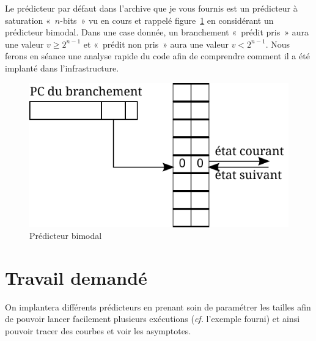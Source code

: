 \documentclass[a4paper]{article}
\begin{document}
Le prédicteur par défaut dans l'archive que je vous fournis est un prédicteur à saturation «~$n$-bits~» vu en cours et rappelé figure~\ref{2-bit} en considérant un prédicteur bimodal.
Dans une case donnée, un branchement «~prédit pris~» aura une valeur $v\geq 2^{n-1}$ et «~prédit non pris~» aura une valeur $v<2^{n-1}$.
Nous ferons en séance une analyse rapide du code afin de comprendre comment il a été implanté dans l'infrastructure.

\begin{figure}[htb]
      \center\includegraphics[scale=1]{2-bits}
      \caption{Prédicteur bimodal}
      \label{2-bit}
\end{figure}

\section{Travail demandé}
On implantera différents prédicteurs en prenant soin de paramétrer les tailles afin de pouvoir lancer facilement plusieurs exécutions (\emph{cf.} l'exemple fourni) et ainsi pouvoir tracer des courbes et voir les asymptotes.
\end{document}
